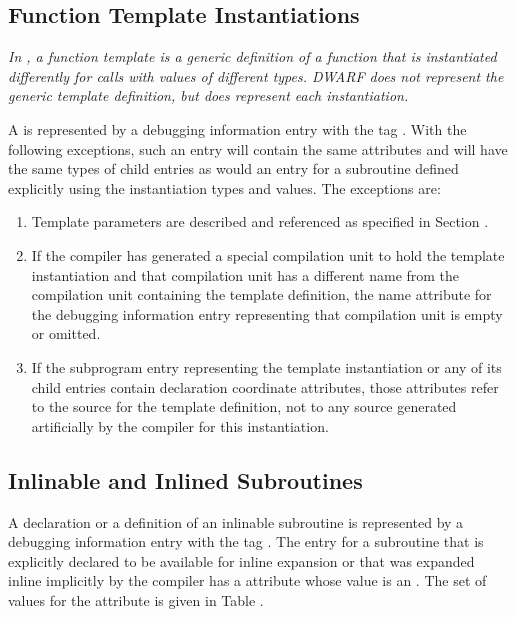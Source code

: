 \subsection{Function Template Instantiations}
\label{chap:functiontemplateinstantiations}

\textit{In , a function template is a generic definition of
a function that is instantiated differently for calls with
values of different types. DWARF does not represent the generic
template definition, but does represent each instantiation.}

A  is represented by a debugging
information entry with the 
tag \DWTAGsubprogram. 
With the following
exceptions, such an entry will contain the same attributes and
will have the same types of child entries as would an entry
for a subroutine defined explicitly using the instantiation
types and values. The exceptions are:

\begin{enumerate}[1. ]
\item Template parameters are described and referenced as specified in
Section .

\item If the compiler has generated a special compilation unit
to hold the template instantiation and that compilation unit
has a different name from the compilation unit containing
the template definition, the name attribute for the debugging
information entry representing that compilation unit is empty
or omitted.

\item If the subprogram entry representing the template
instantiation or any of its child entries contain declaration
coordinate attributes, those attributes refer to the source
for the template definition, not to any source generated
artificially by the compiler for this instantiation.
\end{enumerate}


\subsection{Inlinable and Inlined Subroutines}
A declaration or a definition of an inlinable subroutine
is represented by a debugging information entry with the
tag 
\DWTAGsubprogram.
The entry for a 
subroutine that is
\hypertarget{chap:DWATinlineinlinedsubroutine}{}
explicitly declared to be available for inline expansion or
that was expanded inline implicitly by the compiler has 
a
\DWATinline{} attribute whose value is an 
. The
set of values for the \DWATinline{} attribute is given in
Table .

